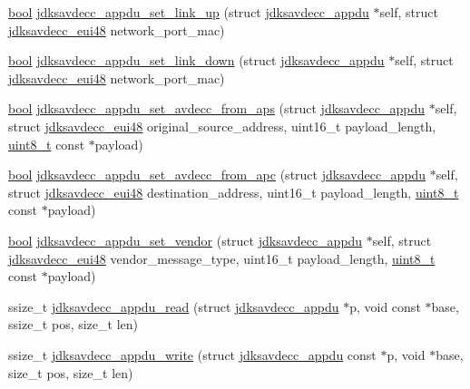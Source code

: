 \begin{DoxyCompactItemize}
\item 
\hyperlink{avb__gptp_8h_af6a258d8f3ee5206d682d799316314b1}{bool} \hyperlink{group__app_ga0a293bbde92d72d9ccd2b8922d649d0b}{jdksavdecc\+\_\+appdu\+\_\+set\+\_\+link\+\_\+up} (struct \hyperlink{structjdksavdecc__appdu}{jdksavdecc\+\_\+appdu} $\ast$self, struct \hyperlink{structjdksavdecc__eui48}{jdksavdecc\+\_\+eui48} network\+\_\+port\+\_\+mac)
\item 
\hyperlink{avb__gptp_8h_af6a258d8f3ee5206d682d799316314b1}{bool} \hyperlink{group__app_ga5d75152cb400bf958844c2099959534e}{jdksavdecc\+\_\+appdu\+\_\+set\+\_\+link\+\_\+down} (struct \hyperlink{structjdksavdecc__appdu}{jdksavdecc\+\_\+appdu} $\ast$self, struct \hyperlink{structjdksavdecc__eui48}{jdksavdecc\+\_\+eui48} network\+\_\+port\+\_\+mac)
\item 
\hyperlink{avb__gptp_8h_af6a258d8f3ee5206d682d799316314b1}{bool} \hyperlink{group__app_ga6a479d0d70d1cef17ba1f79420074538}{jdksavdecc\+\_\+appdu\+\_\+set\+\_\+avdecc\+\_\+from\+\_\+aps} (struct \hyperlink{structjdksavdecc__appdu}{jdksavdecc\+\_\+appdu} $\ast$self, struct \hyperlink{structjdksavdecc__eui48}{jdksavdecc\+\_\+eui48} original\+\_\+source\+\_\+address, uint16\+\_\+t payload\+\_\+length, \hyperlink{stdint_8h_aba7bc1797add20fe3efdf37ced1182c5}{uint8\+\_\+t} const $\ast$payload)
\item 
\hyperlink{avb__gptp_8h_af6a258d8f3ee5206d682d799316314b1}{bool} \hyperlink{group__app_ga04847b72d4e704877ee24c8eeb63df0f}{jdksavdecc\+\_\+appdu\+\_\+set\+\_\+avdecc\+\_\+from\+\_\+apc} (struct \hyperlink{structjdksavdecc__appdu}{jdksavdecc\+\_\+appdu} $\ast$self, struct \hyperlink{structjdksavdecc__eui48}{jdksavdecc\+\_\+eui48} destination\+\_\+address, uint16\+\_\+t payload\+\_\+length, \hyperlink{stdint_8h_aba7bc1797add20fe3efdf37ced1182c5}{uint8\+\_\+t} const $\ast$payload)
\item 
\hyperlink{avb__gptp_8h_af6a258d8f3ee5206d682d799316314b1}{bool} \hyperlink{group__app_ga1495674472eb6516915a9edd588d61b3}{jdksavdecc\+\_\+appdu\+\_\+set\+\_\+vendor} (struct \hyperlink{structjdksavdecc__appdu}{jdksavdecc\+\_\+appdu} $\ast$self, struct \hyperlink{structjdksavdecc__eui48}{jdksavdecc\+\_\+eui48} vendor\+\_\+message\+\_\+type, uint16\+\_\+t payload\+\_\+length, \hyperlink{stdint_8h_aba7bc1797add20fe3efdf37ced1182c5}{uint8\+\_\+t} const $\ast$payload)
\item 
ssize\+\_\+t \hyperlink{group__app_gaa7c23b8cb57a079768c0f19d290cf543}{jdksavdecc\+\_\+appdu\+\_\+read} (struct \hyperlink{structjdksavdecc__appdu}{jdksavdecc\+\_\+appdu} $\ast$p, void const $\ast$base, ssize\+\_\+t pos, size\+\_\+t len)
\item 
ssize\+\_\+t \hyperlink{group__app_ga3a14ba0b03ca60976933ae6f98e18a7c}{jdksavdecc\+\_\+appdu\+\_\+write} (struct \hyperlink{structjdksavdecc__appdu}{jdksavdecc\+\_\+appdu} const $\ast$p, void $\ast$base, size\+\_\+t pos, size\+\_\+t len)
\end{DoxyCompactItemize}


